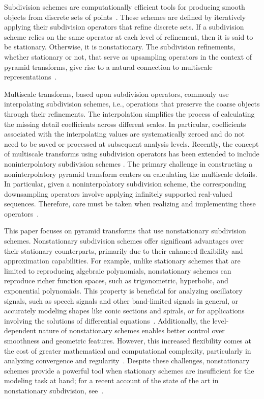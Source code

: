 \documentclass[11pt,a4paper]{article}
\theoremstyle{definition}
\begin{document}
Subdivision schemes are computationally efficient tools for producing smooth objects from discrete sets of points~\cite{dyn1992subdivision}. These schemes are defined by iteratively applying their subdivision operators that refine discrete sets. If a subdivision scheme relies on the same operator at each level of refinement, then it is said to be stationary. Otherwise, it is nonstationary. The subdivision refinements, whether stationary or not, that serve as upsampling operators in the context of pyramid transforms, give rise to a natural connection to multiscale representations~\cite{daubechies1992ten, cohen1996nonstationary}. 

Multiscale transforms, based upon subdivision operators, commonly use interpolating subdivision schemes, i.e., operations that preserve the coarse objects through their refinements. The interpolation simplifies the process of calculating the missing detail coefficients across different scales. In particular, coefficients associated with the interpolating values are systematically zeroed and do not need to be saved or processed at subsequent analysis levels. Recently, the concept of multiscale transforms using subdivision operators has been extended to include noninterpolatory subdivision schemes \cite{dyn2021linear, mattar2023pyramid}. The primary challenge in constructing a noninterpolatory pyramid transform centers on calculating the multiscale details. In particular, given a noninterpolatory subdivision scheme, the corresponding downsampling operators involve applying infinitely supported real-valued sequences. Therefore, care must be taken when realizing and implementing these operators~\cite{mattar2023pyramid, mattar2023pseudo}. 

This paper focuses on pyramid transforms that use nonstationary subdivision schemes. Nonstationary subdivision schemes offer significant advantages over their stationary counterparts, primarily due to their enhanced flexibility and approximation capabilities. For example, unlike stationary schemes that are limited to reproducing algebraic polynomials, nonstationary schemes can reproduce richer function spaces, such as trigonometric, hyperbolic, and exponential polynomials. This property is beneficial for analyzing oscillatory signals, such as speech signals and other band-limited signals in general, or accurately modeling shapes like conic sections and spirals, or for applications involving the solutions of differential equations~\cite{conti2017beyond, conti2011algebraic}. Additionally, the level-dependent nature of nonstationary schemes enables better control over smoothness and geometric features. However, this increased flexibility comes at the cost of greater mathematical and computational complexity, particularly in analyzing convergence and regularity~\cite{dyn1995analysis, dyn2003exponentials}. Despite these challenges, nonstationary schemes provide a powerful tool when stationary schemes are insufficient for the modeling task at hand; for a recent account of the state of the art in nonstationary subdivision, see~\cite{conti2021non}.
\end{document}
